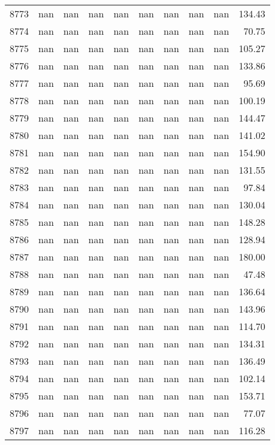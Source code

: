 \begin{tabular}{lrrrrrrrrr}
8773 & nan & nan & nan & nan & nan & nan & nan & nan & 134.43 \\
8774 & nan & nan & nan & nan & nan & nan & nan & nan & 70.75 \\
8775 & nan & nan & nan & nan & nan & nan & nan & nan & 105.27 \\
8776 & nan & nan & nan & nan & nan & nan & nan & nan & 133.86 \\
8777 & nan & nan & nan & nan & nan & nan & nan & nan & 95.69 \\
8778 & nan & nan & nan & nan & nan & nan & nan & nan & 100.19 \\
8779 & nan & nan & nan & nan & nan & nan & nan & nan & 144.47 \\
8780 & nan & nan & nan & nan & nan & nan & nan & nan & 141.02 \\
8781 & nan & nan & nan & nan & nan & nan & nan & nan & 154.90 \\
8782 & nan & nan & nan & nan & nan & nan & nan & nan & 131.55 \\
8783 & nan & nan & nan & nan & nan & nan & nan & nan & 97.84 \\
8784 & nan & nan & nan & nan & nan & nan & nan & nan & 130.04 \\
8785 & nan & nan & nan & nan & nan & nan & nan & nan & 148.28 \\
8786 & nan & nan & nan & nan & nan & nan & nan & nan & 128.94 \\
8787 & nan & nan & nan & nan & nan & nan & nan & nan & 180.00 \\
8788 & nan & nan & nan & nan & nan & nan & nan & nan & 47.48 \\
8789 & nan & nan & nan & nan & nan & nan & nan & nan & 136.64 \\
8790 & nan & nan & nan & nan & nan & nan & nan & nan & 143.96 \\
8791 & nan & nan & nan & nan & nan & nan & nan & nan & 114.70 \\
8792 & nan & nan & nan & nan & nan & nan & nan & nan & 134.31 \\
8793 & nan & nan & nan & nan & nan & nan & nan & nan & 136.49 \\
8794 & nan & nan & nan & nan & nan & nan & nan & nan & 102.14 \\
8795 & nan & nan & nan & nan & nan & nan & nan & nan & 153.71 \\
8796 & nan & nan & nan & nan & nan & nan & nan & nan & 77.07 \\
8797 & nan & nan & nan & nan & nan & nan & nan & nan & 116.28 \\

\end{tabular}
